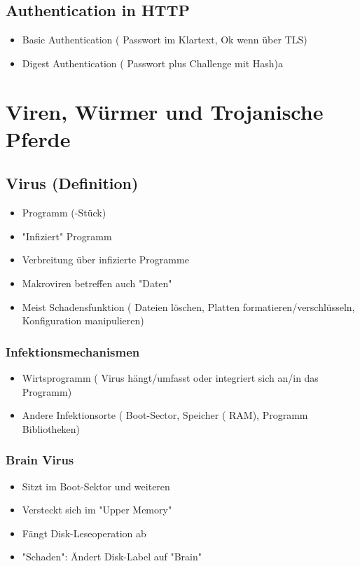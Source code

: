 \subsection*{ Authentication in HTTP}
\begin{itemize}
	\item Basic Authentication ( Passwort im Klartext, Ok wenn über TLS)
	\item Digest Authentication ( Passwort plus Challenge mit Hash)a
\end{itemize}




\section*{Viren, Würmer und Trojanische Pferde}
	\subsection*{ Virus (Definition)}
	\begin{itemize}
		\item Programm (-Stück)
		\item "Infiziert" Programm
		\item Verbreitung über infizierte Programme
		\item Makroviren betreffen auch "Daten" 
		\item Meist Schadensfunktion ( Dateien löschen, Platten formatieren/verschlüsseln, Konfiguration manipulieren)
	\end{itemize}
	\subsubsection*{ Infektionsmechanismen}
	\begin{itemize}
		\item Wirtsprogramm ( Virus hängt/umfasst oder integriert sich an/in das Programm)
		\item Andere Infektionsorte ( Boot-Sector, Speicher ( RAM), Programm Bibliotheken)
	\end{itemize}
	
	\subsubsection*{Brain Virus}
	\begin{itemize}
		\item  Sitzt im Boot-Sektor und weiteren
		\item Versteckt sich im "Upper Memory"
		\item Fängt Disk-Leseoperation ab
		\item "Schaden": Ändert Disk-Label auf "Brain"
	\end{itemize}
	
